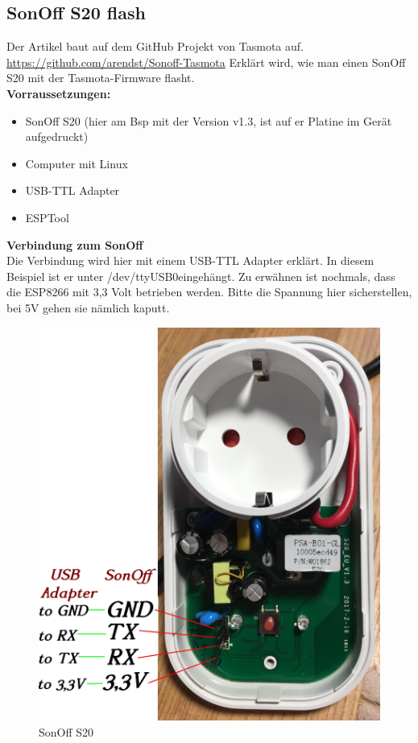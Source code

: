 \documentclass[11pt,fleqn]{book} %
\numberwithin{equation}{section} %
\numberwithin{figure}{section} %
\numberwithin{table}{section} %
\begin{document}
\subsection{SonOff S20 flash}
Der Artikel baut auf dem GitHub Projekt von Tasmota auf. \url{https://github.com/arendst/Sonoff-Tasmota} Erklärt wird, wie man einen SonOff S20 mit der Tasmota-Firmware flasht.\\
\textbf{Vorraussetzungen:}
\begin{itemize}
 \item SonOff S20 (hier am Bsp mit der Version v1.3, ist auf er Platine im Gerät aufgedruckt)
 \item Computer mit Linux
 \item USB-TTL Adapter
 \item ESPTool
\end{itemize}
\textbf{Verbindung zum SonOff}\\
Die Verbindung wird hier mit einem USB-TTL Adapter erklärt. In diesem Beispiel ist er unter \glqq /dev/ttyUSB0\grqq eingehängt. Zu erwähnen ist nochmals, dass die ESP8266 mit 3,3 Volt betrieben werden. Bitte die Spannung hier sicherstellen, bei 5V gehen sie nämlich kaputt. 
\begin{figure}[!h]%
\centering
    \includegraphics[scale=0.06]{Pictures/sonoff_s20.JPG}
  \caption{SonOff S20\label{pic:sonoff-s20-connect} }
\end{figure}
\end{document}
